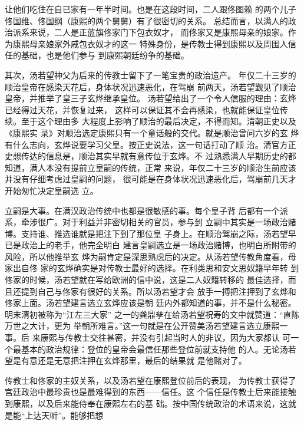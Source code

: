 让他们吃住在自已家有一年半时间。也是在这段时间，二人跟佟图赖%
的两个儿子佟国维、佟国纲（康熙的两个舅舅）有了很密切的关系。%
总结而言，以满人的政治派系来说，二人是正蓝旗佟家门下包衣奴才，%
而佟家又是康熙母亲的娘家。作为康熙母亲娘家外戚包衣奴才的这一%
特殊身份，是传教士得到康熙以及周围人信任的基础，也是他们参与%
到康熙朝廷纷争的基础。%
\par
其次，汤若望神父为后来的传教士留下了一笔宝贵的政治遗产。%
年仅二十三岁的顺治皇帝在感染天花后，身体状况迅速恶化，在驾崩%
前两天，汤若望觐见了顺治皇帝，并推举了皇三子玄烨继承皇位。%
汤若望给出了一个令人信服的理由：玄烨已经得过天花，并恢复过来，%
这样可以保证其不会再感染，也就能保证皇位传续。至于这个理由多%
大程度上影响了顺治的最后决定，不得而知。清朝正史以及《康熙实%
录》对顺治选定康熙只有一个童话般的交代。就是顺治曾问六岁的玄%
烨有什么志向，玄烨说要学习父皇。按正史说法，这一句话打动了顺%
治。清官方正史想传达的信息是，顺治其实早就有意传位于玄烨。不%
过熟悉满人早期历史的都知道，满人本没有提前立皇嗣的传统，正常%
来说，年仅二十三岁的顺治生前应该并没有仔细考虑过皇嗣的问题，%
很可能是在身体状况迅速恶化后，驾崩前几天才开始匆忙决定皇嗣选%
立。%
\par
立嗣是大事。在满汉政治传统中也都是很敏感的事。每个皇子背%
后都有一个派系，牵涉很广。对于利益并非密切相关的官员，参与到%
立嗣中其实是一场政治赌博。支持谁、推选谁就是把注下到了那位皇%
子身上。在顺治驾崩之际，汤若望早已是政治上的老手，他完全明白%
建言皇嗣选立是一场政治赌博，也明白所附带的风险，所以他推举玄%
烨为嗣肯定是深思熟虑后的决定。从汤若望传教角度看，母家出自佟%
家的玄烨确实是对传教士最好的选择。在利类思和安文思奴籍早年转%
到佟家的时候，汤若望就在写给欧洲的信中说，这是二人奴籍转移的%
最佳选择，而且还提到自己与佟家有很好的关系。所以汤若望才会%
放手一搏把注押到了玄烨和佟家上面。汤若望建言选立玄烨应该是朝%
廷内外都知道的事，并不是什么秘密。明末清初被称为“江左三大家”%
之一的龚鼎孳在给汤若望祝寿的文中就赞道：“直陈万世之大计，更为%
举朝所难言。”这一句就是在公开赞美汤若望建言选立康熙一事。后%
来康熙与传教士交往甚密，并没有引起当时人的非议，因为大家都认%
可一个最基本的政治规律：登位的皇帝会最信任那些登位前就支持他%
的人。无论汤若望是有意还是无意把注押在玄烨那里，最后的结果就%
是他赌对了。%
\par
传教士和佟家的主奴关系，以及汤若望在康熙登位前后的表现，%
为传教士获得了宫廷政治中最珍贵也是最难得到的东西——信任。这%
个信任是传教士后来能接触到康熙，以及后来能侍奉在康熙左右的基%
础。按中国传统政治的术语来说，这就是能“上达天听”。能够把想%
